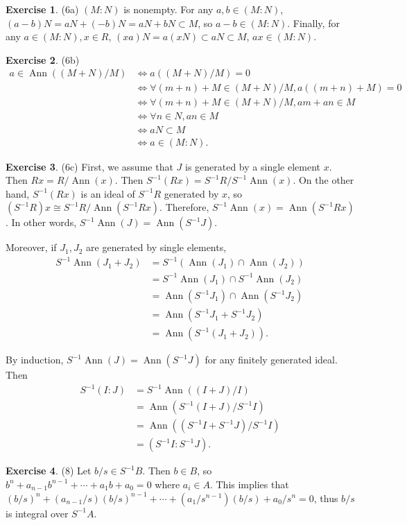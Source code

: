 \documentclass[12pt, psamsfonts]{amsart}
\theoremstyle{definition}
\newtheorem*{exer}{Exercise}
\theoremstyle{remark}
\DeclareMathOperator{\Ann}{Ann}
\numberwithin{equation}{section}
\begin{document}
\begin{exer}{(6a)}
  $(M:N)$ is nonempty.
  For any $a, b \in (M:N)$, $(a - b)N = aN + (-b)N = aN + bN \subset M$, so $a - b \in (M:N)$.
  Finally, for any $a \in (M:N), x \in R$, $(xa)N = a(xN) \subset aN \subset M$, $ax \in (M:N)$.
\end{exer}

\begin{exer}{(6b)}
  $ $
  \begin{align*}
    a \in \Ann((M + N) / M)
      &\iff a((M + N) / M) = 0 \\
      &\iff \forall (m + n) + M \in (M + N) / M, a((m + n) + M) = 0 \\
      &\iff \forall (m + n) + M \in (M + N) / M, am + an \in M \\
      &\iff \forall n \in N, an \in M \\
      &\iff aN \subset M \\
      &\iff a \in (M:N).
  \end{align*}
\end{exer}

\begin{exer}{(6c)}
  First, we assume that $J$ is generated by a single element $x$.
  Then $Rx = R / \Ann(x)$.
  Then $S^{-1}(Rx) = S^{-1}R / S^{-1}\Ann(x)$.
  On the other hand, $S^{-1}(Rx)$ is an ideal of $S^{-1}R$ generated by $x$, so $(S^{-1}R)x \cong S^{-1}R / \Ann(S^{-1}Rx)$.
  Therefore, $S^{-1}\Ann(x) = \Ann(S^{-1}Rx)$.
  In other words, $S^{-1}\Ann(J) = \Ann(S^{-1}J)$.

  Moreover, if $J_1, J_2$ are generated by single elements, 
  \begin{align*}
    S^{-1}\Ann(J_1 + J_2)
      &= S^{-1}(\Ann(J_1) \cap \Ann(J_2)) \\
      &= S^{-1}\Ann(J_1) \cap S^{-1}\Ann(J_2) \\
      &= \Ann(S^{-1}J_1) \cap \Ann(S^{-1}J_2) \\
      &= \Ann(S^{-1}J_1 + S^{-1}J_2) \\
      &= \Ann(S^{-1}(J_1 + J_2)).
  \end{align*}

  By induction, $S^{-1}\Ann(J) = \Ann(S^{-1}J)$ for any finitely generated ideal.
  Then 
  \begin{align*}
    S^{-1}(I:J)
      &= S^{-1}\Ann((I + J) / I) \\
      &= \Ann(S^{-1}(I + J) / S^{-1}I) \\
      &= \Ann((S^{-1}I + S^{-1}J) / S^{-1}I) \\
      &= (S^{-1}I:S^{-1}J).
  \end{align*}
\end{exer}

\begin{exer}{(8)}
  Let $b / s \in S^{-1}B$.
  Then $b \in B$, so $b^n + a_{n - 1}b^{n - 1} + \cdots + a_1b + a_0 = 0$ where $a_i \in A$.
  This implies that $(b / s)^n + (a_{n - 1} / s)(b / s)^{n - 1} + \cdots + (a_1 / s^{n - 1})(b / s) + a_0 / s^n = 0$, thus $b / s$ is integral over $S^{-1}A$.
\end{exer}
\end{document}
